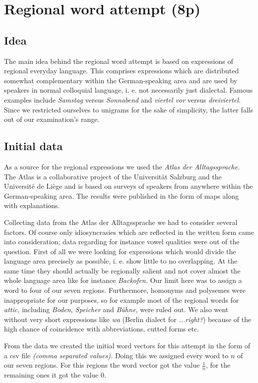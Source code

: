 \documentclass[../Main.tex]{subfiles}
\begin{document}
\section{Regional word attempt (8p)}
\subsection{Idea}
The main idea behind the regional word attempt is based on expressions of regional everyday language. This comprises expressions which are distributed somewhat complementary within the German-speaking area and are used by speakers in normal colloquial language, i. e. not necessarily just dialectal. Famous examples include \textit{Samstag} versus \textit{Sonnabend} and \textit{viertel vor} versus \textit{dreiviertel}. Since we restricted ourselves to unigrams for the sake of simplicity, the latter falls out of our examination's range.

\subsection{Initial data}
As a source for the regional expressions we used the \textit{Atlas der Alltagssprache.} The Atlas is a collaborative project of the Universität Salzburg and the Université de Liège and is based on surveys of speakers from anywhere within the German-speaking area. The results were published in the form of maps along with explanations.

Collecting data from the Atlas der Alltagssprache we had to consider several factors. Of course only idiosyncrasies which are reflected in the written form came into consideration; data regarding for instance vowel qualities were out of the question. First of all we were looking for expressions which would divide the language area precisely as possible, i. e. show little to no overlapping. At the same time they should actually be regionally salient and not cover almost the whole language area like for instance \textit{Backofen.} Our limit here was to assign a word to four of our seven regions. Furthermore, homonyms and polysemes were inappropriate for our purposes, so for example most of the regional words for \textit{attic,} including \textit{Boden,} \textit{Speicher} and \textit{Bühne,} were ruled out. We also went without very short expressions like \textit{wa} (Berlin dialect for \textit{...right?}) because of the high chance of coincidence with abbreviations, cutted forms etc.

From the data we created the initial word vectors for this attempt in the form of a csv file \textit{(comma separated values).} Doing this we assigned every word to $n$ of our seven regions. For this regions the word vector got the value $\frac 1 n$, for the remaining ones it got the value 0.
\end{document}

